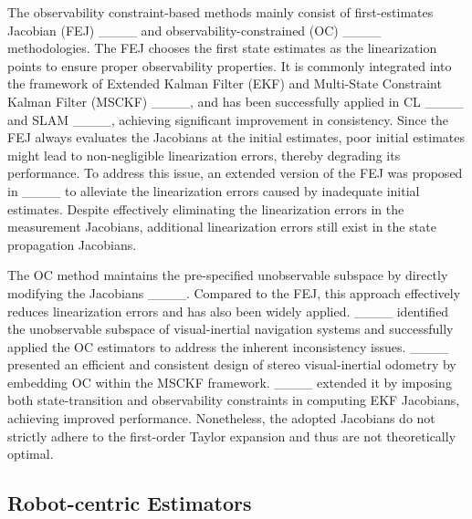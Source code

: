 The observability constraint-based methods mainly consist of first-estimates Jacobian (FEJ) ____ and observability-constrained (OC) ____ methodologies. The FEJ chooses the first state estimates as the linearization points to ensure proper observability properties. It is commonly integrated into the framework of Extended Kalman Filter (EKF) and Multi-State Constraint Kalman Filter (MSCKF) ____, and has been successfully applied in CL ____ and SLAM ____, achieving significant improvement in consistency. Since the FEJ always evaluates the Jacobians at the initial estimates, poor initial estimates might lead to non-negligible linearization errors, thereby degrading its performance. To address this issue, an extended version of the FEJ was proposed in ____ to alleviate the linearization errors caused by inadequate initial estimates. Despite effectively eliminating the linearization errors in the measurement Jacobians, additional linearization errors still exist in the state propagation Jacobians.

The OC method maintains the pre-specified unobservable subspace by directly modifying the Jacobians ____. Compared to the FEJ, this approach effectively reduces linearization errors and has also been widely applied. ____ identified the unobservable subspace of visual-inertial navigation systems and successfully applied the OC estimators to address the inherent inconsistency issues. ____ presented an efficient and consistent design of stereo visual-inertial odometry by embedding OC within the MSCKF framework. ____ extended it by imposing both state-transition and observability constraints in computing EKF Jacobians, achieving improved performance. Nonetheless, the adopted Jacobians do not strictly adhere to the first-order Taylor expansion and thus are not theoretically optimal.

\subsection{Robot-centric Estimators}

